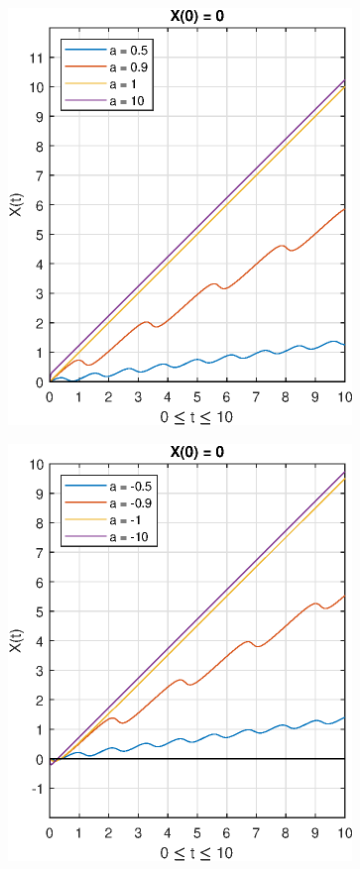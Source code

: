 \documentclass[11pt]{article} %
\begin{document}
\begin{figure}[h]
	\centering
	\begin{subfigure}{0.5\textwidth}
	\centering
		\includegraphics[width=\textwidth]{"../Matlab Files/x0=0 apos"}
	\end{subfigure}%
	\begin{subfigure}{0.5\textwidth}
	\centering
		\includegraphics[width=\textwidth]{"../Matlab Files/x0=0 aneg"}

\end{subfigure}
\end{figure}
\end{document}
